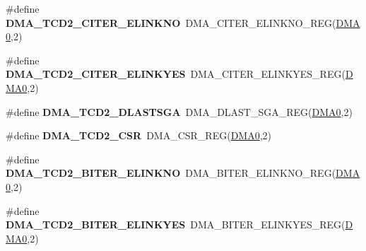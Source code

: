 \begin{DoxyCompactItemize}
\item 
\#define {\bfseries D\+M\+A\+\_\+\+T\+C\+D2\+\_\+\+C\+I\+T\+E\+R\+\_\+\+E\+L\+I\+N\+K\+NO}~D\+M\+A\+\_\+\+C\+I\+T\+E\+R\+\_\+\+E\+L\+I\+N\+K\+N\+O\+\_\+\+R\+EG(\hyperlink{group__DMA__Peripheral__Access__Layer_ga4103044f9ca209772f513dc694513ffb}{D\+M\+A0},2)\hypertarget{group__DMA__Register__Accessor__Macros_gaa7002957f90bec11cfb5acbdafd3c3b2}{}\label{group__DMA__Register__Accessor__Macros_gaa7002957f90bec11cfb5acbdafd3c3b2}

\item 
\#define {\bfseries D\+M\+A\+\_\+\+T\+C\+D2\+\_\+\+C\+I\+T\+E\+R\+\_\+\+E\+L\+I\+N\+K\+Y\+ES}~D\+M\+A\+\_\+\+C\+I\+T\+E\+R\+\_\+\+E\+L\+I\+N\+K\+Y\+E\+S\+\_\+\+R\+EG(\hyperlink{group__DMA__Peripheral__Access__Layer_ga4103044f9ca209772f513dc694513ffb}{D\+M\+A0},2)\hypertarget{group__DMA__Register__Accessor__Macros_ga63cb3dda75d3169276a55872ec2ac0a3}{}\label{group__DMA__Register__Accessor__Macros_ga63cb3dda75d3169276a55872ec2ac0a3}

\item 
\#define {\bfseries D\+M\+A\+\_\+\+T\+C\+D2\+\_\+\+D\+L\+A\+S\+T\+S\+GA}~D\+M\+A\+\_\+\+D\+L\+A\+S\+T\+\_\+\+S\+G\+A\+\_\+\+R\+EG(\hyperlink{group__DMA__Peripheral__Access__Layer_ga4103044f9ca209772f513dc694513ffb}{D\+M\+A0},2)\hypertarget{group__DMA__Register__Accessor__Macros_ga03556e18fbd384f9629fc80815c370ac}{}\label{group__DMA__Register__Accessor__Macros_ga03556e18fbd384f9629fc80815c370ac}

\item 
\#define {\bfseries D\+M\+A\+\_\+\+T\+C\+D2\+\_\+\+C\+SR}~D\+M\+A\+\_\+\+C\+S\+R\+\_\+\+R\+EG(\hyperlink{group__DMA__Peripheral__Access__Layer_ga4103044f9ca209772f513dc694513ffb}{D\+M\+A0},2)\hypertarget{group__DMA__Register__Accessor__Macros_ga868475048617575cf190c20189c586ee}{}\label{group__DMA__Register__Accessor__Macros_ga868475048617575cf190c20189c586ee}

\item 
\#define {\bfseries D\+M\+A\+\_\+\+T\+C\+D2\+\_\+\+B\+I\+T\+E\+R\+\_\+\+E\+L\+I\+N\+K\+NO}~D\+M\+A\+\_\+\+B\+I\+T\+E\+R\+\_\+\+E\+L\+I\+N\+K\+N\+O\+\_\+\+R\+EG(\hyperlink{group__DMA__Peripheral__Access__Layer_ga4103044f9ca209772f513dc694513ffb}{D\+M\+A0},2)\hypertarget{group__DMA__Register__Accessor__Macros_gaa27b02c8585b159ffc7b78f32c3d7b2d}{}\label{group__DMA__Register__Accessor__Macros_gaa27b02c8585b159ffc7b78f32c3d7b2d}

\item 
\#define {\bfseries D\+M\+A\+\_\+\+T\+C\+D2\+\_\+\+B\+I\+T\+E\+R\+\_\+\+E\+L\+I\+N\+K\+Y\+ES}~D\+M\+A\+\_\+\+B\+I\+T\+E\+R\+\_\+\+E\+L\+I\+N\+K\+Y\+E\+S\+\_\+\+R\+EG(\hyperlink{group__DMA__Peripheral__Access__Layer_ga4103044f9ca209772f513dc694513ffb}{D\+M\+A0},2)\hypertarget{group__DMA__Register__Accessor__Macros_ga7105375c432e810701dc580bbe2c97f7}{}\label{group__DMA__Register__Accessor__Macros_ga7105375c432e810701dc580bbe2c97f7}


\end{DoxyCompactItemize}
